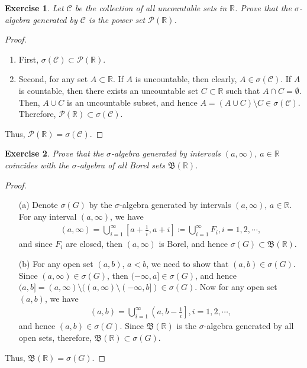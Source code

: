 \documentclass[11pt]{book}
\newtheorem{exercise}{Exercise}[chapter]
\theoremstyle{definition}
\numberwithin{equation}{chapter}
\def\BB{\mathfrak{B}}
\begin{document}
\begin{exercise}
Let $\mathcal{C}$ be the collection of all uncountable sets in $\mathbb{R}$. Prove that the $\sigma$-algebra generated by $\mathcal{C}$ is the power set $\mathcal{P}(\mathbb{R})$.
\end{exercise}
\begin{proof} 
~\begin{enumerate}[label=(\alph*)]
    \item First, $\sigma(\mathcal{C}) \subset \mathcal{P}(\mathbb{R})$.
    
    \item Second, for any set $A \subset \mathbb{R}$. If $A$ is uncountable, then clearly, $A \in \sigma(\mathcal{C})$. If $A$ is countable, then there exists an uncountable set $C \subset \mathbb{R}$ such that $A \cap C = \emptyset$. Then, $A \cup C$ is an uncountable subset, and hence $A = (A \cup C) \setminus C \in \sigma(\mathcal{C})$. Therefore, $\mathcal{P}(\mathbb{R}) \subset \sigma(\mathcal{C})$.
\end{enumerate}
Thus, $\mathcal{P}(\mathbb{R}) = \sigma(\mathcal{C})$.
\end{proof}

\medskip

\begin{exercise}
Prove that the $\sigma$-algebra generated by intervals $(a,\infty)$, $a\in\mathbb{R}$ coincides with the $\sigma$-algebra of all Borel sets $\BB(\mathbb{R})$.
\end{exercise}
\begin{proof}
~\begin{enumerate}
    \item[(a)] Denote $\sigma(G)$ by the $\sigma$-algebra generated by intervals $(a,\infty)$, $a\in\mathbb{R}$. For any interval $(a,\infty)$, we have
    \begin{align*}
        (a,\infty) = \bigcup^\infty_{i=1} \left[a + \frac{1}{i}, a + i\right] \coloneqq \bigcup^\infty_{i=1} F_i, i = 1,2,\cdots,
    \end{align*}
    and since $F_i$ are closed, then $(a,\infty)$ is Borel, and hence $\sigma(G) \subset \BB(\mathbb{R})$.
    
    \item[(b)] For any open set $(a,b)$, $a < b$, we need to show that $(a,b) \in \sigma(G)$. Since $(a,\infty) \in \sigma(G)$, then $(-\infty,a] \in \sigma(G)$, and hence $(a,b] = (a,\infty) \setminus ((a,\infty) \setminus (-\infty,b]) \in \sigma(G)$. Now for any open set $(a,b)$, we have
    \begin{align*}
        (a,b) = \bigcup^\infty_{i=1} \left(a,b-\frac{1}{i}\right], i = 1,2,\cdots,
    \end{align*}
    and hence $(a,b) \in \sigma(G)$. Since $\BB(\mathbb{R})$ is the $\sigma$-algebra generated by all open sets, therefore, $\BB(\mathbb{R}) \subset \sigma(G)$.
\end{enumerate}
Thus, $\BB(\mathbb{R}) = \sigma(G)$.
\end{proof}
\end{document}
